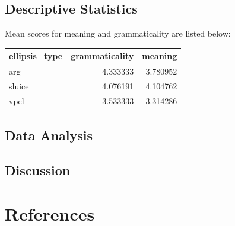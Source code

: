 \documentclass[
  man,floatsintext]{apa6}
\newlength{\cslhangindent}
\newlength{\cslentryspacingunit} %
\newenvironment{CSLReferences}[2] %
 {%
  \setlength{\parindent}{0pt}
  \ifodd #1
  \let\oldpar\par
  \def\par{\hangindent=\cslhangindent\oldpar}
  \fi
  \setlength{\parskip}{#2\cslentryspacingunit}
 }%
 {}
\begin{document}
\hypertarget{descriptive-statistics}{%
\subsection{Descriptive Statistics}\label{descriptive-statistics}}

Mean scores for meaning and grammaticality are listed below:

\begin{tabular}{l|r|r}
\hline
ellipsis\_type & grammaticality & meaning\\
\hline
arg & 4.333333 & 3.780952\\
\hline
sluice & 4.076191 & 4.104762\\
\hline
vpel & 3.533333 & 3.314286\\
\hline
\end{tabular}

\hypertarget{data-analysis}{%
\subsection{Data Analysis}\label{data-analysis}}

\hypertarget{discussion}{%
\subsection{Discussion}\label{discussion}}

\newpage

\hypertarget{references}{%
\section{References}\label{references}}

\hypertarget{refs}{}
\begin{CSLReferences}{0}{0}
\end{CSLReferences}
\end{document}
